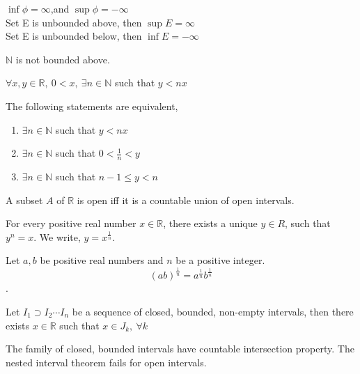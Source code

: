 	\begin{remark}
		$\inf \phi = \infty$,and $\sup \phi = -\infty$\\
		Set E is unbounded above, then $\sup E = \infty$\\
		Set E is unbounded below, then $\inf E = -\infty$
	\end{remark}

	\begin{theorem}
		$\mathbb{N}$ is not bounded above.
	\end{theorem}

	\begin{theorem}[Archimedean]
		$\forall x,y \in \mathbb{R},\ 0<x,\ \exists n \in \mathbb{N}$ such that $y < nx$
	\end{theorem}

	\begin{remark} The following statements are equivalent,
		\begin{enumerate}
			\item $\exists n \in \mathbb{N}$ such that $y < nx$
			\item $\exists n \in \mathbb{N}$ such that $0 < \frac{1}{n} < y$
			\item $\exists n \in \mathbb{N}$ such that $n-1 \le y < n$
		\end{enumerate}
	\end{remark}

	\begin{theorem}
		A subset $A$ of $\mathbb{R}$ is open iff it is a countable union of open intervals.
	\end{theorem}

	\begin{theorem}
		For every positive real number $x \in \mathbb{R}$, there exists a unique $y \in R$,
		such that $y^n = x$. We write, $y = x^\frac{1}{n}$.
	\end{theorem}

	\begin{corollary}
		Let $a,b$ be positive real numbers and $n$ be a positive integer.
		$$(ab)^\frac{1}{n} = a^\frac{1}{n} b^\frac{1}{n}$$.
	\end{corollary}

	\begin{theorem}
		Let $I_1 \supset I_2 \cdots I_n$ be a sequence of closed, bounded, non-empty intervals, then there exists $x \in \mathbb{R}$ such that $x \in J_k,\ \forall k$
	\end{theorem}

	\begin{remark}
		The family of closed, bounded intervals have countable intersection property.
		The nested interval theorem fails for open intervals.
	\end{remark}


